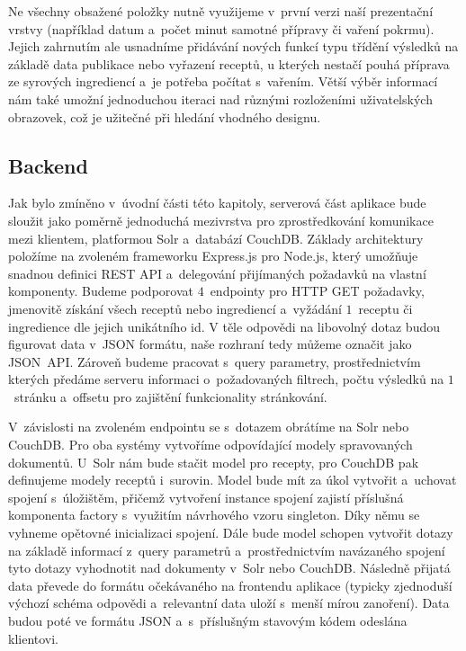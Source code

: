 Ne všechny obsažené položky nutně využijeme v~první verzi naší prezentační vrstvy (například datum a~počet minut samotné přípravy či vaření pokrmu). Jejich zahrnutím ale usnadníme přidávání nových funkcí typu třídění výsledků na základě data publikace nebo vyřazení receptů, u kterých nestačí pouhá příprava ze syrových ingrediencí a~je potřeba počítat s~vařením. Větší výběr informací nám také umožní jednoduchou iteraci nad různými rozloženími uživatelských obrazovek, což je užitečné při hledání vhodného designu.

\subsection{Backend}

Jak bylo zmíněno v~úvodní části této kapitoly, serverová část aplikace bude sloužit jako poměrně jednoduchá mezivrstva pro zprostředkování komunikace mezi klientem, platformou Solr a~databází CouchDB. Základy architektury položíme na zvoleném frameworku Express.js pro Node.js, který umožňuje snadnou definici REST API a~delegování přijímaných požadavků na vlastní komponenty. Budeme podporovat $4$~endpointy pro HTTP GET požadavky, jmenovitě získání všech receptů nebo ingrediencí a~vyžádání $1$~receptu či ingredience dle jejich unikátního id. V těle odpovědi na libovolný dotaz budou figurovat data v~JSON formátu, naše rozhraní tedy můžeme označit jako JSON~API. Zároveň budeme pracovat s~query parametry, prostřednictvím kterých předáme serveru informaci o~požadovaných filtrech, počtu výsledků na $1$~stránku a~offsetu pro zajištění funkcionality stránkování.

V~závislosti na zvoleném endpointu se s~dotazem obrátíme na Solr nebo \,CouchDB. Pro oba systémy vytvoříme odpovídající modely spravovaných dokumentů. U~Solr nám bude stačit model pro recepty, pro CouchDB pak definujeme modely receptů i~surovin. Model bude mít za úkol vytvořit a~uchovat spojení s~úložištěm, přičemž vytvoření instance spojení zajistí příslušná komponenta factory s~využitím návrhového vzoru singleton. Díky němu se vyhneme opětovné inicializaci spojení. Dále bude model schopen vytvořit dotazy na základě informací z~query parametrů a~prostřednictvím navázaného spojení tyto dotazy vyhodnotit nad dokumenty v~Solr nebo CouchDB. Následně přijatá data převede do formátu očekávaného na frontendu aplikace (typicky zjednoduší výchozí schéma odpovědi a~relevantní data uloží s~menší mírou zanoření). Data budou poté ve formátu JSON a~s~příslušným stavovým kódem odeslána klientovi. 

